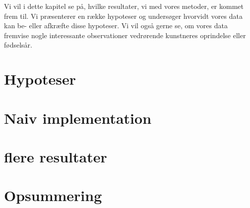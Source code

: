 {
{\sffamily Vi vil i dette kapitel se på, hvilke resultater, vi med vores
metoder, er kommet frem til. Vi præsenterer en række hypoteser og
undersøger hvorvidt vores data kan be- eller afkræfte disse hypoteser.
Vi vil også gerne se, om vores data fremvise nogle interessante
observationer vedrørende kunstneres oprindelse eller fødselsår.
}

\section{Hypoteser}


\section{Naiv implementation\label{section_naiv_koersel}}

\clearpage

\section{flere resultater}


\section*{Opsummering}

}
